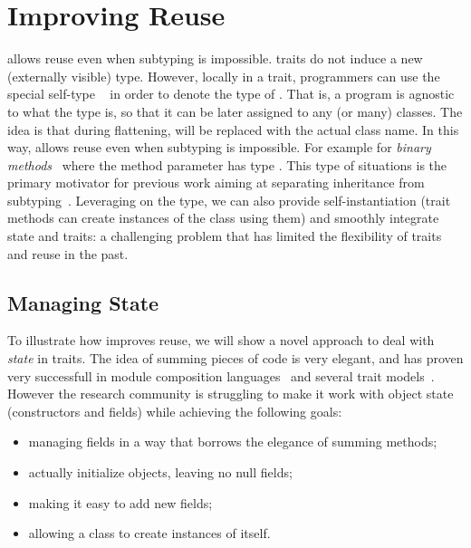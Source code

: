 \saveSpace\saveSpace\section{Improving Reuse}\saveSpace
\name allows reuse even when subtyping is impossible.
\name traits do not induce a new (externally visible) type.
However, locally in a trait, programmers can use the special self-type \Q@This@~\cite{bruce_1994,Saito:2009,ryu16ThisType} in order to denote the 
type of \Q@this@.
That is, a program is agnostic to what the \Q@This@ type is, so that it can
be later assigned to any (or many) classes. 
The idea is that during flattening, \Q@This@ will be replaced with the actual class name.
In this way, \name allows reuse even when subtyping is
impossible. For example for \emph{binary
  methods}~\cite{bruce96binary} where the method parameter has type \Q@This@. 
This type of situations is the primary motivator
for previous work aiming at separating inheritance from subtyping~\cite{cook}.
Leveraging on the \Q@This@ type, we can also provide self-instantiation (trait methods can create instances of the class using them) and smoothly integrate state and traits: a challenging problem that has limited the flexibility of traits and
reuse in the past.

\subsection{Managing State}

To illustrate how \name improves reuse, we will show a novel approach
to deal with \emph{state} in traits.  The idea of summing pieces of
code is very elegant, and has proven very successfull in module
composition languages~\cite{ancona2002calculus} and several trait
models~\cite{Traits:ECOOP2003,Bergel2007,BETTINI2013521,fjig}.  However the research
community is struggling to make it work with object state (constructors
and fields) while achieving the following goals:

\begin{itemize}
\item managing fields in a way that borrows the elegance of summing methods;
\item actually initialize objects, leaving no null fields;
\item making it easy to add new fields;
\item allowing a class to create instances of itself.
\end{itemize}


